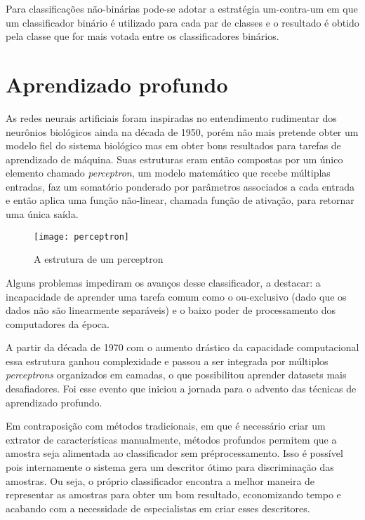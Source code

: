 Para classificações não-binárias pode-se adotar a estratégia um-contra-um em que um classificador binário é utilizado para cada par de classes e o resultado é obtido pela classe que for mais votada entre os classificadores binários.

\section{Aprendizado profundo}
As redes neurais artificiais foram inspiradas no entendimento rudimentar dos neurônios biológicos ainda na década de 1950, porém não mais pretende obter um modelo fiel do sistema biológico mas em obter bons resultados para tarefas de aprendizado de máquina. Suas estruturas eram então compostas por um único elemento chamado \textit{perceptron}, um modelo matemático que recebe múltiplas entradas, faz um somatório ponderado por parâmetros associados a cada entrada e então aplica uma função não-linear, chamada função de ativação, para retornar uma única saída.

\begin{figure}[h]
\caption{A estrutura de um perceptron}
\centering
\texttt{[image: perceptron]}
\label{fig:perceptron}
\end{figure}

Alguns problemas impediram os avanços desse classificador, a destacar: a incapacidade de aprender uma tarefa comum como o ou-exclusivo (dado que os dados não são linearmente separáveis) e o baixo poder de processamento dos computadores da época.

A partir da década de 1970 com o aumento drástico da capacidade computacional essa estrutura ganhou complexidade e passou a ser integrada por múltiplos \textit{perceptrons} organizados em camadas, o que possibilitou aprender datasets mais desafiadores. Foi esse evento que iniciou a jornada para o advento das técnicas de aprendizado profundo.

Em contraposição com métodos tradicionais, em que é necessário criar um extrator de características manualmente, métodos profundos permitem que a amostra seja alimentada ao classificador sem préprocessamento. Isso é possível pois internamente o sistema gera um descritor ótimo para discriminação das amostras. Ou seja, o próprio classificador encontra a melhor maneira de representar as amostras para obter um bom resultado, economizando tempo e acabando com a necessidade de especialistas em criar esses descritores. %

